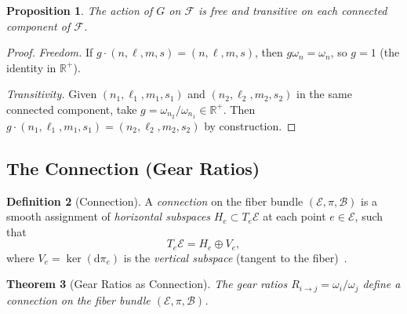 \documentclass[11pt,twocolumn,a4paper]{article}
\newtheorem{theorem}{Theorem}[section]
\newtheorem{proposition}[theorem]{Proposition}
\theoremstyle{definition}
\newtheorem{definition}[theorem]{Definition}
\newcommand{\R}{\mathbb{R}}
\newcommand{\Fib}{\mathcal{F}}
\newcommand{\Bsp}{\mathcal{B}}
\newcommand{\Esp}{\mathcal{E}}
\newcommand{\dif}{\mathrm{d}}
\newcommand{\Rij}{R_{i \to j}}
\begin{document}
\begin{proposition}\label{prop:group_action}
The action of $G$ on $\Fib$ is free and transitive on each connected component of $\Fib$.
\end{proposition}

\begin{proof}
\emph{Freedom.} If $g \cdot (n, \ell, m, s) = (n, \ell, m, s)$, then $g \omega_n = \omega_n$,
so $g = 1$ (the identity in $\R^+$).

\emph{Transitivity.} Given $(n_1, \ell_1, m_1, s_1)$ and $(n_2, \ell_2, m_2, s_2)$ in
the same connected component, take $g = \omega_{n_2}/\omega_{n_1} \in \R^+$. Then
$g \cdot (n_1, \ell_1, m_1, s_1) = (n_2, \ell_2, m_2, s_2)$ by construction.
\end{proof}

\subsection{The Connection (Gear Ratios)}\label{sec:fb:connection}

\begin{definition}[Connection]\label{def:connection}
A \emph{connection} on the fiber bundle $(\Esp, \pi, \Bsp)$ is a smooth assignment of
\emph{horizontal subspaces} $H_e \subset T_e\Esp$ at each point $e \in \Esp$, such that
\begin{equation}\label{eq:connection_decomp}
  T_e\Esp = H_e \oplus V_e,
\end{equation}
where $V_e = \ker(\dif\pi_e)$ is the \emph{vertical subspace} (tangent to the
fiber)~\cite{kobayashi1963,nakahara2003}.
\end{definition}

\begin{theorem}[Gear Ratios as Connection]\label{thm:gearratio_connection}
The gear ratios $\Rij = \omega_i / \omega_j$ define a connection on the fiber bundle
$(\Esp, \pi, \Bsp)$.
\end{theorem}
\end{document}

